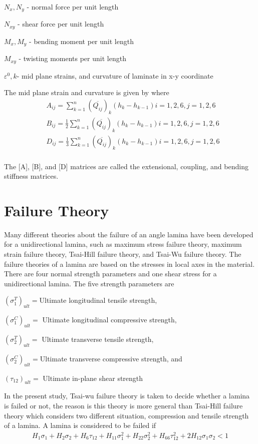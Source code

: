 \documentclass[USenglish]{article}
\begin{document}
$N_x,N_y $  - normal force per unit length

$N_{xy} $  - shear force per unit length

$M_x, M_y $ - bending moment per unit length

$M_{xy} $  - twisting moments per unit length

$\varepsilon^{0}, k $- mid plane strains, and curvature of laminate in x-y coordinate

The mid plane strain and curvature is given by
where 
\begin{equation}
    \begin{split}
    &A_{ij}=\sum_{k=1}^{n}(\overline{Q_{ij}})_k(h_k-h_{k-1})  i=1,2,6, j=1,2,6\\
    &B_{ij}=\frac{1}{2}\sum_{k=1}^{n}(\overline{Q_{ij}})_k(h_k-h_{k-1})  i=1,2,6, j=1,2,6\\
    &D_{ij}=\frac{1}{3}\sum_{k=1}^{n}(\overline{Q_{ij}})_k(h_k-h_{k-1}) i=1,2,6, j=1,2,6\\
    \end{split}
\end{equation}

The [A], [B], and [D] matrices are called the extensional, coupling, and bending stiffness matrices.

    
\section{Failure Theory}
Many different theories about the failure of an angle lamina have been developed for a
unidirectional lamina, such as maximum stress failure theory, maximum strain failure theory,
Tsai-Hill failure theory, and Tsai-Wu failure theory. The failure theories of a lamina are based on
the stresses in local axes in the material. There are four normal strength parameters and one shear
stress for a unidirectional lamina. The five strength parameters are  

$(\sigma _1^{T})_{ult}= $Ultimate longitudinal tensile strength,

$(\sigma _1^{C})_{ult}= $ Ultimate longitudinal compressive strength,

$(\sigma _2^{T})_{ult}= $ Ultimate transverse tensile strength,

$(\sigma _2^{C})_{ult}= $Ultimate transverse compressive strength, and

$(\tau_{12})_{ult}= $ Ultimate in-plane shear strength

  In the present study, Tsai-wu failure theory is taken to decide whether a lamina is failed or not,
the reason is this theory is more general than Tsai-Hill failure theory which considers two
different situation, compression and tensile strength of a lamina. A lamina is considered to be
failed if \begin{equation} \label{eq:tsai_wu}
\begin{split}
	H_1 \sigma_1  + H_2 \sigma_2 + H_6 \tau_{12} + H_{11}\sigma_1^2 + H_{22} \sigma_2^2 
                  + H_{66}  \tau_{12}^2 + 2H_{12}\sigma_1\sigma_2 < 1
\end{split}
\end{equation}
\end{document}
